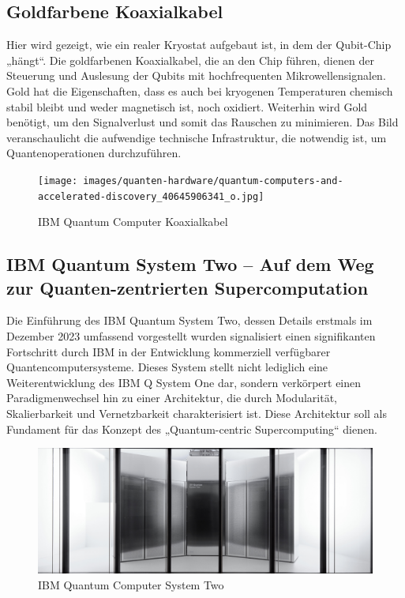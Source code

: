 \subsection{Goldfarbene Koaxialkabel}
Hier wird gezeigt, wie ein realer Kryostat aufgebaut ist, in dem der Qubit-Chip „hängt“. Die goldfarbenen Koaxialkabel, die an den Chip führen, dienen der Steuerung und Auslesung der Qubits mit hochfrequenten Mikrowellensignalen. Gold hat die Eigenschaften, dass es auch bei kryogenen Temperaturen chemisch stabil bleibt und weder magnetisch ist, noch oxidiert. Weiterhin wird Gold benötigt, um den Signalverlust und somit das Rauschen zu minimieren. Das Bild veranschaulicht die aufwendige technische Infrastruktur, die notwendig ist, um Quantenoperationen durchzuführen.

\begin{figure}[H]
    \centering
    \texttt{[image: images/quanten-hardware/quantum-computers-and-accelerated-discovery\_40645906341\_o.jpg]}
    \caption{IBM Quantum Computer Koaxialkabel}
    \label{fig:quantumkoaxialkabel}
\end{figure}


\subsection{IBM Quantum System Two – Auf dem Weg zur Quanten-zentrierten Supercomputation}
Die Einführung des IBM Quantum System Two, dessen Details erstmals im Dezember 2023 umfassend vorgestellt wurden 
signalisiert einen signifikanten Fortschritt durch IBM in der Entwicklung kommerziell verfügbarer Quantencomputersysteme. Dieses System stellt nicht lediglich eine Weiterentwicklung des IBM Q System One dar, sondern verkörpert einen Paradigmenwechsel hin zu einer Architektur, die durch Modularität, Skalierbarkeit und Vernetzbarkeit charakterisiert ist. Diese Architektur soll als Fundament für das Konzept des „Quantum-centric Supercomputing“ dienen.

\begin{figure}[H]
    \centering
    \includegraphics[width=\textwidth]{images/quanten-hardware/IBM-Quantum_System-Two_Riken_banner.jpg}
    \caption{IBM Quantum Computer System Two}
    \label{fig:ibmquantumsystemtwo}
\end{figure}


